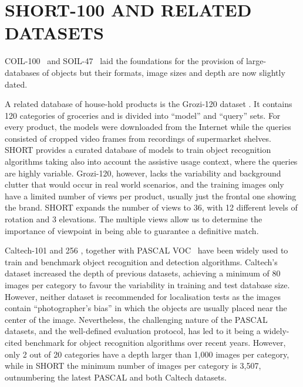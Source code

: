 \section{SHORT-100 AND RELATED DATASETS} \label{sec:related-work}

COIL-100~\cite{Nene1996a} and SOIL-47~\cite{Koubaroulis2002} laid the foundations for the provision of large-databases of objects but their formats, image sizes and depth are now slightly dated.

A related database of house-hold products is the Grozi-120 dataset \cite{Merler2007}. It contains 120 categories of groceries and is divided into ``model'' and ``query'' sets. For every product, the models were downloaded from the Internet while the queries consisted of cropped video frames from recordings of supermarket shelves. SHORT provides a curated database of models to train object recognition algorithms taking also into account the assistive usage context, where the queries are highly variable. Grozi-120, however, lacks the variability and background clutter that would occur in real world scenarios, and the training images only have a limited number of views per product, usually just the frontal one showing the brand. SHORT expands the number of views to 36, with 12 different levels of rotation and 3 elevations.  The multiple views allow us to determine the importance of viewpoint in being able to guarantee a definitive match. 

Caltech-101 and 256 \cite{Feifei2007,Griffin2007}, together with PASCAL VOC~\cite{Everingham2009} have been widely used to train and benchmark object recognition and detection algorithms. Caltech's dataset increased the depth of previous datasets, achieving a minimum of 80 images per category to favour the variability in training and test database size. However, neither dataset is recommended for localisation tests as the images contain ``photographer's bias'' in which the objects are usually placed near the center of the image. Nevertheless, the challenging nature of the PASCAL datasets, and the well-defined evaluation protocol, has led to it being a widely-cited benchmark for object recognition algorithms over recent years. However, only 2 out of 20 categories have a depth larger than 1,000 images per category, while in SHORT the minimum number of images per category is 3,507, outnumbering the latest PASCAL and both Caltech datasets.
 
